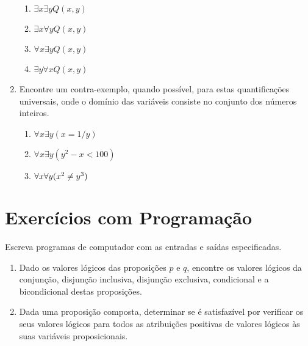 \begin{enumerate}
	\begin{enumerate}
		\item $\exists x\exists yQ(x,y)$
		\item $\exists x\forall yQ(x,y)$
		\item $\forall x\exists yQ(x,y)$
		\item $\exists y\forall xQ(x,y)$
	\end{enumerate}
	\item Encontre um contra-exemplo, quando possível, para estas quantificações
	universais, onde o domínio das variáveis consiste no conjunto dos números
	inteiros.
	\begin{enumerate}
	  \item $\forall x\exists y(x = 1/y)$
	  \item $\forall x\exists y(y^2 - x < 100)$
	  \item $\forall x\forall y(x^2 \centernot{=} y^3)$
  	\end{enumerate}
\end{enumerate}

\newpage
\section*{Exercícios com Programação}

Escreva programas de computador com as entradas e saídas especificadas.
\begin{enumerate}
  \item Dado os valores lógicos das proposições $p$ e $q$, encontre os valores
  lógicos da conjunção, disjunção inclusiva, disjunção exclusiva, condicional e
  a bicondicional destas proposições.
  \item Dada uma proposição composta, determinar se é satisfazível por verificar
  os seus valores lógicos para todos as atribuições positivas de valores lógicos
  às suas variáveis proposicionais.
\end{enumerate}